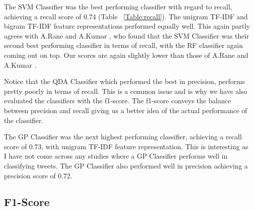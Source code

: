 The SVM Classifier was the best performing classifier with regard to recall, achieving a recall score of 0.74 (Table ~\ref{Table:recall}). The unigram TF-IDF and bigram TF-IDF feature representations performed equally well. This again partly agrees with A.Rane and A.Kumar \cite{Rane2018}, who found that the SVM Classifier was their second best performing classifier in terms of recall, with the RF classifier again coming out on top. Our scores are again slightly lower than those of A.Rane and A.Kumar \cite{Rane2018}.

Notice that the QDA Classifier which performed the best in precision, performs pretty poorly in terms of recall. This is a common issue and is why we have also evaluated the classifiers with the f1-score. The f1-score conveys the balance between precision and recall giving us a better idea of the actual performance of the classifier.

The GP Classifier was the next highest performing classifier, achieving a recall score of 0.73, with unigram TF-IDF feature representation. This is interesting as I have not come across any studies where a GP Classifier performs well in classifying tweets. The GP Classifier also performed well in precision achieving a precision score of 0.72.  

\subsection{F1-Score}

